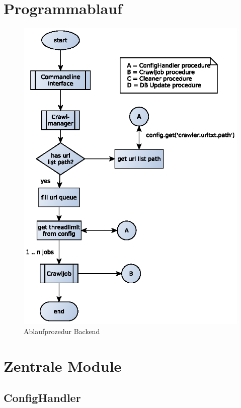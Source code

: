 \section{Programmablauf} 
\label{sec:programmablauf}
\begin{figure}[h]
	\centering
	\label{dia:design:backend:overview}
	\includegraphics[width=\textwidth]{design/data/backend_procedure.eps}
	\caption{Ablaufprozedur Backend}
\end{figure}



\section{Zentrale Module} 
\label{sec:zentrale_module}

\subsection{ConfigHandler}
\label{sub:confighandler}
